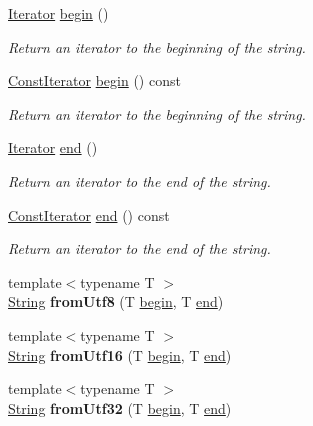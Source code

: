 \begin{DoxyCompactItemize}
\hyperlink{classsf_1_1_string_ac90f2b7b28f703020f8d027e98806235}{Iterator} \hyperlink{classsf_1_1_string_a8ec30ddc08e3a6bd11c99aed782f6dfe}{begin} ()
\begin{DoxyCompactList}\small\item\em Return an iterator to the beginning of the string. \end{DoxyCompactList}\item 
\hyperlink{classsf_1_1_string_a8e18efc2e8464f6eb82818902d527efa}{Const\+Iterator} \hyperlink{classsf_1_1_string_a0e4755d6b4d51de7c3dc2e984b79f95d}{begin} () const
\begin{DoxyCompactList}\small\item\em Return an iterator to the beginning of the string. \end{DoxyCompactList}\item 
\hyperlink{classsf_1_1_string_ac90f2b7b28f703020f8d027e98806235}{Iterator} \hyperlink{classsf_1_1_string_ac823012f39cb6f61100418876e99d53b}{end} ()
\begin{DoxyCompactList}\small\item\em Return an iterator to the end of the string. \end{DoxyCompactList}\item 
\hyperlink{classsf_1_1_string_a8e18efc2e8464f6eb82818902d527efa}{Const\+Iterator} \hyperlink{classsf_1_1_string_af1ab4c82ff2bdfb6903b4b1bb78a8e5c}{end} () const
\begin{DoxyCompactList}\small\item\em Return an iterator to the end of the string. \end{DoxyCompactList}\item 
\mbox{\label{classsf_1_1_string_a0b93eacbb10ea41f25669f2ace0148c2}} 
{\footnotesize template$<$typename T $>$ }\\\hyperlink{classsf_1_1_string}{String} {\bfseries from\+Utf8} (T \hyperlink{classsf_1_1_string_a8ec30ddc08e3a6bd11c99aed782f6dfe}{begin}, T \hyperlink{classsf_1_1_string_ac823012f39cb6f61100418876e99d53b}{end})
\item 
\mbox{\label{classsf_1_1_string_acf4be994a8f801ef399ef934e892c891}} 
{\footnotesize template$<$typename T $>$ }\\\hyperlink{classsf_1_1_string}{String} {\bfseries from\+Utf16} (T \hyperlink{classsf_1_1_string_a8ec30ddc08e3a6bd11c99aed782f6dfe}{begin}, T \hyperlink{classsf_1_1_string_ac823012f39cb6f61100418876e99d53b}{end})
\item 
\mbox{\label{classsf_1_1_string_aecbcc789c2505f1583c586516be82a94}} 
{\footnotesize template$<$typename T $>$ }\\\hyperlink{classsf_1_1_string}{String} {\bfseries from\+Utf32} (T \hyperlink{classsf_1_1_string_a8ec30ddc08e3a6bd11c99aed782f6dfe}{begin}, T \hyperlink{classsf_1_1_string_ac823012f39cb6f61100418876e99d53b}{end})
\end{DoxyCompactItemize}
